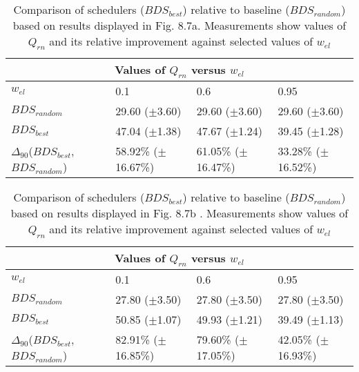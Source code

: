 \clearpage
\begin{landscape}
\begin{table}[h]
\begin{center}
\begin{tabular}{llll}
\toprule
\multicolumn{4}{c}{Values of $Q_{rn}$ versus $w_{el}$}\\
\midrule
$w_{el}$ & 0.1 & 0.6 & 0.95\\
\midrule
$BDS_{random}$ &  29.60 ($\pm$3.60) &  29.60 ($\pm$3.60) &  29.60 ($\pm$3.60)\\
\midrule
$BDS_{best}$ &  47.04 ($\pm$1.38) &  47.67 ($\pm$1.24) &  39.45 ($\pm$1.28)\\
$\Delta_{90}$($BDS_{best}$,$BDS_{random}$) & 58.92\% ($\pm$16.67\%) & 61.05\% ($\pm$16.47\%) & 33.28\% ($\pm$16.52\%)\\
\bottomrule
\end{tabular}
\end{center}
\caption[Comparison of $Q_{rn}$ versus $w_{el}$ for $BDS_{best}$ relative to $BDS_{random}$.]{Comparison of schedulers ($BDS_{best}$) relative to baseline ($BDS_{random}$) based on results displayed in Fig. 8.7a. Measurements show values of $Q_{rn}$ and its relative improvement against selected values of $w_{el}$}
\label{b:f87a}
\end{table}
\end{landscape}


\clearpage
\begin{landscape}
\begin{table}[h]
\begin{center}
\begin{tabular}{llll}
\toprule
\multicolumn{4}{c}{Values of $Q_{rn}$ versus $w_{el}$}\\
\midrule
$w_{el}$ & 0.1 & 0.6 & 0.95\\
\midrule
$BDS_{random}$ &  27.80 ($\pm$3.50) &  27.80 ($\pm$3.50) &  27.80 ($\pm$3.50)\\
\midrule
$BDS_{best}$ &  50.85 ($\pm$1.07) &  49.93 ($\pm$1.21) &  39.49 ($\pm$1.13)\\
$\Delta_{90}$($BDS_{best}$,$BDS_{random}$) & 82.91\% ($\pm$16.85\%) & 79.60\% ($\pm$17.05\%) & 42.05\% ($\pm$16.93\%)\\
\bottomrule
\end{tabular}
\end{center}
\caption[Comparison of $Q_{rn}$ versus $w_{el}$ for $BDS_{best}$ relative to $BDS_{random}$.]{Comparison of schedulers ($BDS_{best}$) relative to baseline ($BDS_{random}$) based on results displayed in Fig. 8.7b . Measurements show values of $Q_{rn}$ and its relative improvement against selected values of $w_{el}$}
\label{b:f87b}
\end{table}
\end{landscape}


